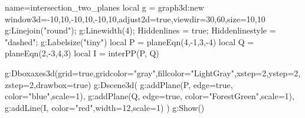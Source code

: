 \usepackage[svgnames]{xcolor}
\usepackage[3d]{luadraw}
\usepackage{fouriernc}

\begin{luadraw}{name=intersection_two_planes}
local g = graph3d:new{ window3d={-10,10,-10,10,-10,10},adjust2d=true,viewdir={30,60},size={10,10}}
g:Linejoin("round"); g:Linewidth(4); Hiddenlines = true; Hiddenlinestyle = "dashed"; g:Labelsize("tiny")
local P = planeEqn(4,-1,3,-4)
local Q = planeEqn(2,-3,4,3) 
local I = interPP(P, Q) 

g:Dboxaxes3d({grid=true,gridcolor="gray",fillcolor="LightGray",xstep=2,ystep=2,zstep=2,drawbox=true})
g:Dscene3d(
    g:addPlane(P, {edge=true, color="blue",scale=1}),
    g:addPlane(Q, {edge=true, color="ForestGreen",scale=1}), 
    g:addLine(I, {color="red",width=12,scale=1})
    )
g:Show()
\end{luadraw} 
 
